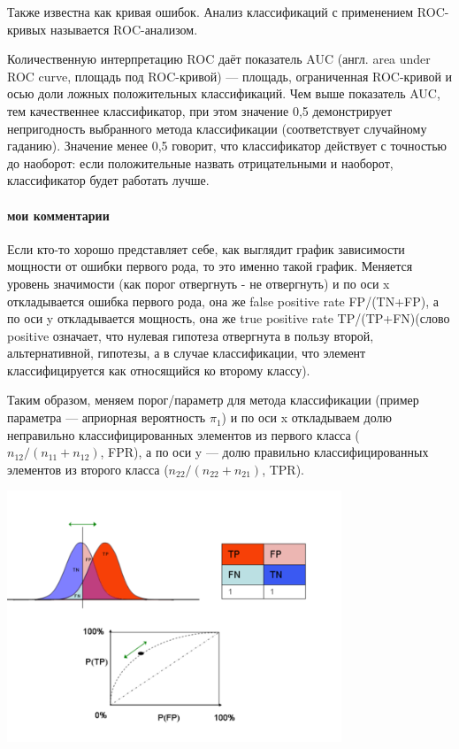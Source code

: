 Также известна как кривая ошибок. Анализ классификаций с применением ROC-кривых называется ROC-анализом.

Количественную интерпретацию ROC даёт показатель AUC (англ. area under ROC curve, площадь под ROC-кривой) — площадь, ограниченная ROC-кривой и осью доли ложных положительных классификаций. Чем выше показатель AUC, тем качественнее классификатор, при этом значение 0,5 демонстрирует непригодность выбранного метода классификации (соответствует случайному гаданию). Значение менее 0,5 говорит, что классификатор действует с точностью до наоборот: если положительные назвать отрицательными и наоборот, классификатор будет работать лучше.

\paragraph{мои комментарии}

Если кто-то хорошо представляет себе, как выглядит график зависимости мощности от ошибки первого рода, то это именно такой график.
Меняется уровень значимости (как порог отвергнуть - не отвергнуть) и по оси x откладывается ошибка первого рода, она же false positive rate FP/(TN+FP), а по оси y откладывается
мощность, она же true positive rate TP/(TP+FN)(слово positive означает, что нулевая гипотеза отвергнута в пользу второй, альтернативной, гипотезы,
а в случае классификации, что элемент классифицируется как относящийся ко второму классу).

Таким образом, меняем порог/параметр для метода классификации (пример параметра --- априорная вероятность $\pi_1$)
и по оси x откладываем долю неправильно классифицированных элементов из первого класса ($n_{12}/(n_{11}+n_{12})$, FPR),
а по оси y --- долю правильно классифицированных элементов из второго класса ($n_{22}/(n_{22}+n_{21})$, TPR).

\includegraphics[width=10cm]{img/expl_roc}

